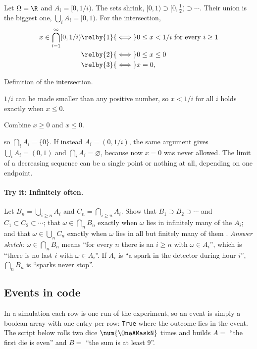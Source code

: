 \label{1a:ex:shrinking}
Let $\Omega=\R$ and $A_i=[0,1/i)$. The sets shrink, $[0,1)\supset[0,\tfrac12)\supset\cdots$.
Their union is the biggest one, $\bigcup_iA_i=[0,1)$. For the intersection,
\begin{align*}
x\in\bigcap_{i=1}^\infty[0,1/i)
&\relby{1}{\iff} 0\le x<1/i\ \text{for every } i\ge1\\
&\relby{2}{\iff} 0\le x\le 0\\
&\relby{3}{\iff} x=0 ,
\end{align*}
\begin{explain}
  \item Definition of the intersection.
  \item $1/i$ can be made smaller than any positive number, so $x<1/i$ for all
        $i$ holds exactly when $x\le0$.
  \item Combine $x\ge0$ and $x\le0$.
\end{explain}
so $\bigcap_iA_i=\{0\}$. If instead $A_i=(0,1/i)$, the same argument gives
$\bigcup_iA_i=(0,1)$ and $\bigcap_iA_i=\varnothing$, because now $x=0$ was
never allowed. The limit of a decreasing sequence can be a single point or
nothing at all, depending on one endpoint.

\paragraph{Try it: Infinitely often.}
Let $B_n=\bigcup_{i\ge n}A_i$ and $C_n=\bigcap_{i\ge n}A_i$. Show that
$B_1\supset B_2\supset\cdots$ and $C_1\subset C_2\subset\cdots$; that
$\omega\in\bigcap_nB_n$ exactly when $\omega$ lies in infinitely many of the
$A_i$; and that $\omega\in\bigcup_nC_n$ exactly when $\omega$ lies in all but
finitely many of them .
\emph{Answer sketch:} $\omega\in\bigcap_nB_n$ means ``for every $n$ there is an
$i\ge n$ with $\omega\in A_i$'', which is ``there is no last $i$ with
$\omega\in A_i$''. If $A_i$ is ``a spark in the detector during hour $i$'',
$\bigcap_nB_n$ is ``sparks never stop''.

\subsection{Events in code}

In a simulation each row is one run of the experiment, so an event is simply
a boolean array with one entry per row: \texttt{True} where the outcome lies
in the event. The script below rolls two dice $\num{\OneAMaskN}$ times and builds
$A=$ ``the first die is even'' and $B=$ ``the sum is at least 9''.

